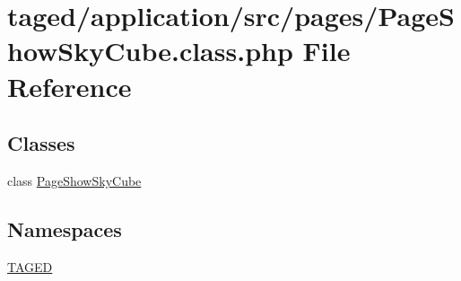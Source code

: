 \hypertarget{_page_show_sky_cube_8class_8php}{}\section{taged/application/src/pages/\+Page\+Show\+Sky\+Cube.class.\+php File Reference}
\label{_page_show_sky_cube_8class_8php}
\subsection*{Classes}
\begin{DoxyCompactItemize}
\item 
class \hyperlink{class_page_show_sky_cube}{Page\+Show\+Sky\+Cube}
\end{DoxyCompactItemize}
\subsection*{Namespaces}
\begin{DoxyCompactItemize}
\item 
 \hyperlink{namespace_t_a_g_e_d}{T\+A\+G\+ED}
\end{DoxyCompactItemize}
